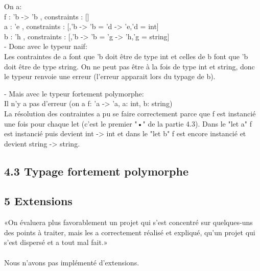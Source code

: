 \documentclass{article}
\begin{document}
{
  On a:\\
  f : 'b -> 'b  , constraints : []\\
  a : 'e        , constraints : [,'b -> 'b = 'd -> 'e,'d = int]\\
  b : 'h        , constraints : [,'b -> 'b = 'g -> 'h,'g = string]\\

  - Donc avec le typeur naif:\\
  Les contraintes de a font que 'b doit être de type int et celles de b font que
  'b doit être de type string. On ne peut pas être à la fois de type int et
  string, donc le typeur renvoie une erreur (l'erreur apparait lors du typage de b).

  - Mais avec le typeur fortement polymorphe:\\
  Il n'y a pas d'erreur (on a f: 'a -> 'a, a: int, b: string)\\
  La résolution des contraintes a pu se faire correctement parce que f est 
  instancié une fois pour chaque let (c'est le premier "•" de la partie 4.3).
  Dans le "let a" f est instancié puis devient int -> int et dans le "let b" f est 
  encore instancié et devient string -> string.

}
{}

{}
{}

\subsection{4.3 Typage fortement polymorphe}

{}
{}

{}
{}

\subsection{5 Extensions }
«On évaluera plus favorablement un projet qui s'est concentré sur quelques-uns
des points à traiter, mais les a correctement réalisé et expliqué, qu'un
projet qui s'est dispersé et a tout mal fait.»
\\
\\
Nous n'avons pas implémenté d'extensions.
\end{document}
